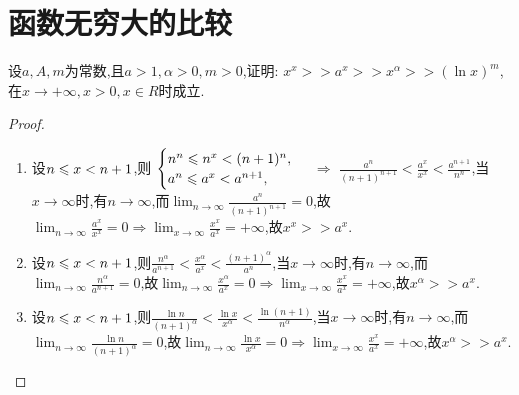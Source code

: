 \section{函数无穷大的比较}

\begin{proposition}[常用函数无穷大]
    设$a,A ,m$为常数,且$a>1,\alpha >0,m>0$,证明:
    $x^x >> a^x >> x^\alpha >> (\ln x)^m$,在$x \rightarrow +\infty, x>0, x \in R$时成立.
\end{proposition}

\begin{proof}
    \begin{enumerate}
        \item 设$n \leqslant x < n+1$,则
              $\begin{cases}
                      n^n \leqslant n^x < (n+1)^n, \\
                      a^n \leqslant a^x < a^{n+1},
                  \end{cases}$ $\Rightarrow$ $\frac{a^n}{(n+1)^{n+1}} < \frac{a^x}{x^x} < \frac{a^{n+1}}{n^n}$,当$x \to \infty$时,有$n \to \infty$,而$\lim_{n \to \infty} \frac{a^n}{(n+1)^{n+1}} = 0$,故$\lim_{n \to \infty} \frac{a^x}{x^x} = 0 \Rightarrow \lim_{x \to \infty} \frac{x^x}{a^x} = +\infty$,故$x^x >> a^x$.
        \item 设$n \leqslant x < n+1$,则$\frac{n^\alpha}{a^{n+1}} < \frac{x^\alpha}{a^x} < \frac{(n+1)^\alpha}{a^n}$,当$x \to \infty$时,有$n \to \infty$,而$\lim_{n \to \infty} \frac{n^\alpha}{a^{n+1}} = 0$,故$\lim_{n \to \infty} \frac{x^\alpha}{a^x} = 0 \Rightarrow \lim_{x \to \infty} \frac{x^x}{a^x} = +\infty$,故$x^\alpha >> a^x$.
        \item 设$n \leqslant x < n+1$,则$\frac{\ln n}{(n+1)^\alpha} < \frac{\ln x}{x^\alpha} < \frac{\ln(n+1)}{n^\alpha}$,当$x \to \infty$时,有$n \to \infty$,而$\lim_{n \to \infty} \frac{\ln n}{(n+1)^\alpha} = 0$,故$\lim_{n \to \infty} \frac{\ln x}{x^\alpha} = 0 \Rightarrow \lim_{x \to \infty} \frac{x^x}{a^x} = +\infty$,故$x^\alpha >> a^x$.
    \end{enumerate}
\end{proof}

